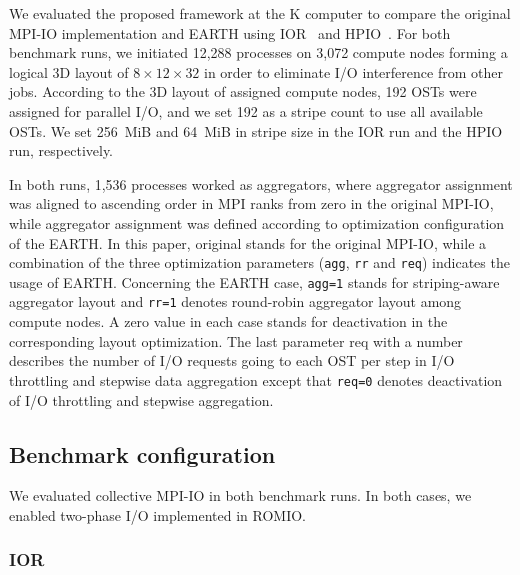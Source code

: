 \documentclass{jhps}
\begin{document}
We evaluated the proposed framework at the K computer to compare
the original MPI-IO implementation and EARTH using IOR~\cite{IOR:web}
and HPIO~\cite{ching:ipdps06}.
For both benchmark runs, we initiated 12,288 processes on 3,072 compute nodes
forming a logical 3D layout of $8\times12\times32$ in order to eliminate I/O interference
from other jobs. According to the 3D layout of assigned compute nodes,
192 OSTs were assigned for parallel I/O, and we set 192 as a stripe count
to use all available OSTs.
We set 256~MiB and 64~MiB in stripe size in the IOR run and the HPIO run, respectively.

In both runs, 1,536 processes worked as aggregators, where aggregator assignment
was aligned to ascending order in MPI ranks from zero in the original MPI-IO,
while aggregator assignment was defined according to optimization configuration
of the EARTH.
In this paper, original stands for the original MPI-IO, while a combination of
the three optimization parameters ({\tt agg}, {\tt rr} and {\tt req}) indicates
the usage of EARTH.
Concerning the EARTH case, {\tt agg=1} stands for striping-aware aggregator layout
and {\tt rr=1} denotes round-robin aggregator layout among compute nodes.
A zero value in each case stands for deactivation in the corresponding layout optimization.
The last parameter req with a number describes the number of I/O requests
going to each OST per step in I/O throttling and stepwise data aggregation
except that {\tt req=0} denotes deactivation of I/O throttling and stepwise aggregation.

\subsection{Benchmark configuration}

We evaluated collective MPI-IO in both benchmark runs.
In both cases, we enabled two-phase I/O implemented in ROMIO.

\subsubsection{IOR}
\end{document}
